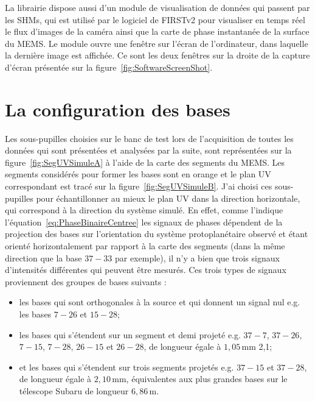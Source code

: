 La librairie dispose aussi d'un module de visualisation de données qui passent par les \ac{SHM}s, qui est utilisé par le logiciel de \ac{FIRSTv2} pour visualiser en temps réel le flux d'images de la caméra ainsi que la carte de phase instantanée de la surface du \ac{MEMS}. Le module ouvre une fenêtre sur l'écran de l'ordinateur, dans laquelle la dernière image est affichée. Ce sont les deux fenêtres sur la droite de la capture d'écran présentée sur la figure~\ref{fig:SoftwareScreenShot}.


\section{La configuration des bases}
\label{sec:BaseConfig}

Les sous-pupilles choisies sur le banc de test lors de l'acquisition de toutes les données qui sont présentées et analysées par la suite, sont représentées sur la figure~\ref{fig:SegUVSimuleA} à l'aide de la carte des segments du \ac{MEMS}. Les segments considérés pour former les bases sont en orange et le plan UV correspondant est tracé sur la figure~\ref{fig:SegUVSimuleB}. J'ai choisi ces sous-pupilles pour échantillonner au mieux le plan UV dans la direction horizontale, qui correspond à la direction du système simulé. En effet, comme l'indique l'équation~\ref{eq:PhaseBinaireCentree} les signaux de phases dépendent de la projection des bases sur l'orientation du système protoplanétaire observé et étant orienté horizontalement par rapport à la carte des segments (dans la même direction que la base $37-33$ par exemple), il n'y a bien que trois signaux d'intensités différentes qui peuvent être mesurés. Ces trois types de signaux proviennent des groupes de bases suivants :
\begin{itemize}
    \item les bases qui sont orthogonales à la source et qui donnent un signal nul e.g. les bases $7-26$ et $15-28$;
    \item les bases qui s'étendent sur un segment et demi projeté e.g. $37-7$, $37-26$, $7-15$, $7-28$, $26-15$ et $26-28$, de longueur égale à $1,05 \,$mm 2,1;
    \item et les bases qui s'étendent sur trois segments projetés e.g. $37-15$ et $37-28$, de longueur égale à $2,10 \,$mm, équivalentes aux plus grandes bases sur le télescope Subaru de longueur $6,86 \,$m.
\end{itemize}

